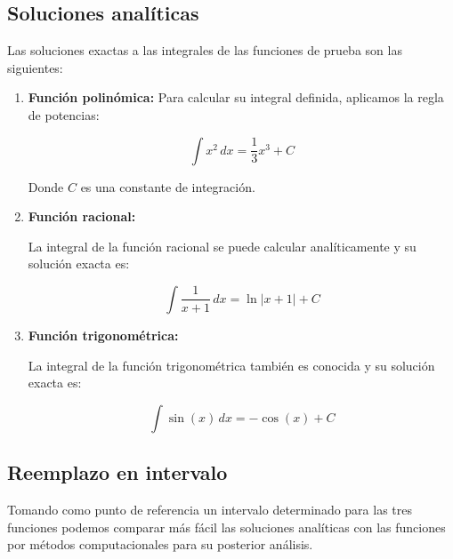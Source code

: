 \documentclass[a4paper]{article}
\begin{document}
    \subsection{Soluciones analíticas}
    Las soluciones exactas a las integrales de las funciones de prueba son las siguientes:

    \begin{enumerate}
     \item \textbf{Función polinómica:}
       Para calcular su integral definida, aplicamos la regla de potencias:
      
      \begin{equation}
      \int x^2 \, dx = \frac{1}{3}x^3 + C
      \end{equation}
      
      Donde \(C\) es una constante de integración.

      \item \textbf{Función racional:}
      
      La integral de la función racional se puede calcular analíticamente y su solución exacta es:
      
      \begin{equation}
      \int \frac{1}{x + 1} \,dx = \ln|x + 1| + C 
      \end{equation}
    
      \item \textbf{Función trigonométrica:}
      
      La integral de la función trigonométrica también es conocida y su solución exacta es:
      
      \begin{equation}
      \int \sin(x) \, dx = -\cos(x) + C
      \end{equation}
      
    \end{enumerate}

    \subsection{Reemplazo en intervalo}

    Tomando como punto de referencia un intervalo determinado para las tres funciones podemos
    comparar más fácil las soluciones analíticas con las funciones por métodos computacionales para 
    su posterior análisis.
\end{document}
